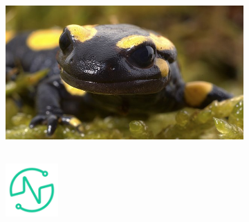 \documentclass[aspectratio=169]{beamer}
\begin{document}
\begin{frame}{}
    \begin{figure}
        \centering
        \begin{subfigure}{.8\textwidth}
            \centering
            \includegraphics[height=6cm]{mlok.jpg}
            \label{fig:sub1}
        \end{subfigure}%
        \begin{subfigure}{.2\textwidth}
            \centering
            \includegraphics[height=2cm]{spse.png}
            \label{fig:sub2}
        \end{subfigure}
    \end{figure}
\end{frame}
\end{document}
